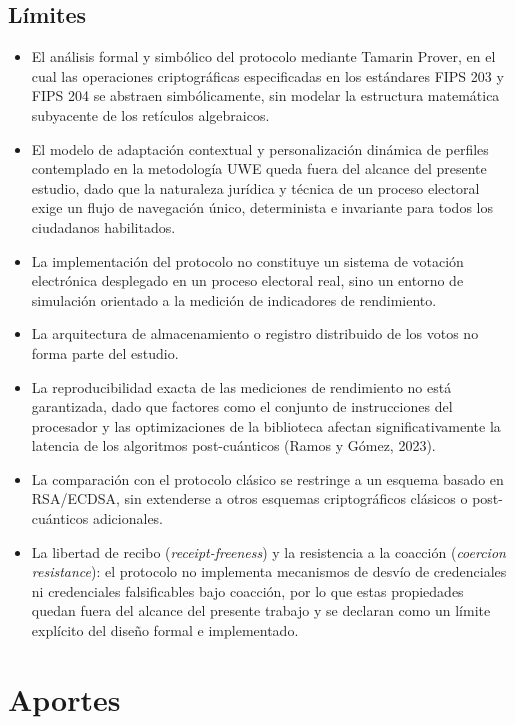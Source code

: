 \subsection{Límites}
\begin{itemize}
	\item El análisis formal y simbólico del protocolo mediante Tamarin Prover, en el cual las operaciones criptográficas especificadas en los estándares FIPS 203 y FIPS 204 se abstraen simbólicamente, sin modelar la estructura matemática subyacente de los retículos algebraicos.
	\item El modelo de adaptación contextual y personalización dinámica de perfiles contemplado en la metodología UWE queda fuera del alcance del presente estudio, dado que la naturaleza jurídica y técnica de un proceso electoral exige un flujo de navegación único, determinista e invariante para todos los ciudadanos habilitados.
	\item La implementación del protocolo no constituye un sistema de votación electrónica desplegado en un proceso electoral real, sino un entorno de simulación orientado a la medición de indicadores de rendimiento.
	\item La arquitectura de almacenamiento o registro distribuido de los votos no forma parte del estudio.
	\item La reproducibilidad exacta de las mediciones de rendimiento no está garantizada, dado que factores como el conjunto de instrucciones del procesador y las optimizaciones de la biblioteca afectan significativamente la latencia de los algoritmos post-cuánticos (Ramos y Gómez, 2023).
	\item La comparación con el protocolo clásico se restringe a un esquema basado en RSA/ECDSA, sin extenderse a otros esquemas criptográficos clásicos o post-cuánticos adicionales.
	\item La libertad de recibo (\textit{receipt-freeness}) y la resistencia a la coacción (\textit{coercion resistance}): el protocolo no implementa mecanismos de desvío de credenciales ni credenciales falsificables bajo coacción, por lo que estas propiedades quedan fuera del alcance del presente trabajo y se declaran como un límite explícito del diseño formal e implementado.
\end{itemize}

\section{Aportes}

